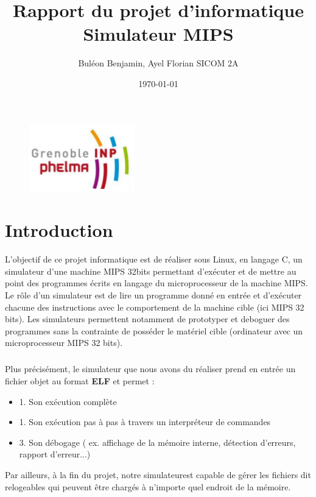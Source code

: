\documentclass[10pt,a4paper]{report}
\begin{document}
\title{Rapport du projet d'informatique Simulateur MIPS}

\author{Buléon Benjamin,\newline
   Ayel Florian\newline
   \newline
   \newline SICOM 2A
}
\date{\today}
\begin{figure}[t]
\includegraphics{phelma.png}
\end{figure}

\maketitle

\tableofcontents

\chapter*{Introduction}
L'objectif de ce projet informatique est de réaliser sous Linux, en langage C, un simulateur d'une machine MIPS 32bits permettant d'exécuter et de mettre au point des programmes écrits en langage du microprocesseur de la machine MIPS. Le rôle d'un simulateur est de lire un programme donné en entrée et d'exécuter chacune des instructions avec le comportement de la machine cible (ici MIPS 32 bits). Les simulateurs permettent notamment de prototyper et deboguer des programmes sans la contrainte de posséder le matériel cible (ordinateur avec un microprocesseur MIPS 32 bits).
\paragraph{}
Plus précisément, le simulateur que nous avons du réaliser prend en entrée un fichier objet au format \textbf{ELF} et permet :
	\begin{itemize}
  	\item 1. Son exécution complète
	\item 1. Son exécution pas à pas à travers un interpréteur de commandes
	\item 3. Son débogage ( ex. affichage de la mémoire interne, détection d'erreurs, rapport d'erreur...)
\end{itemize}
Par ailleurs, à la fin du projet, notre simulateurest capable de gérer les fichiers dit relogeables qui peuvent être chargés à n'importe quel endroit de la mémoire.
\end{document}
